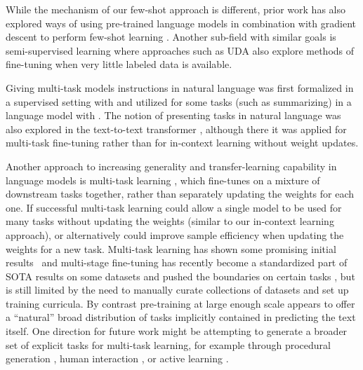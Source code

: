 While the mechanism of our few-shot approach is different, prior work has also explored ways of using pre-trained language models in combination with gradient descent to perform few-shot learning \cite{schick2020exploiting}. Another sub-field with similar goals is semi-supervised learning where approaches such as UDA \cite{xie2019unsupervised} also explore methods of fine-tuning when very little labeled data is available.

Giving multi-task models instructions in natural language was first formalized in a supervised setting with \cite{mccann2018natural} and utilized for some tasks (such as summarizing) in a language model with \cite{radford2019language}.  The notion of presenting tasks in natural language was also explored in the text-to-text transformer  \cite{raffel2019t5}, although there it was applied for multi-task fine-tuning rather than for in-context learning without weight updates.

Another approach to increasing generality and transfer-learning capability in language models is multi-task learning \cite{caruana1997multitask}, which fine-tunes on a mixture of downstream tasks together, rather than separately updating the weights for each one.  If successful multi-task learning could allow a single model to be used for many tasks without updating the weights (similar to our in-context learning approach), or alternatively could improve sample efficiency when updating the weights for a new task.  Multi-task learning has shown some promising initial results~\citep{liu2015representation, liu2018generating} and multi-stage fine-tuning has recently become a standardized part of SOTA results on some datasets \cite{phang2018sentence} and pushed the boundaries on certain tasks \cite{khashabi2020unifiedqa}, but is still limited by the need to manually curate collections of datasets and set up training curricula.  By contrast pre-training at large enough scale appears to offer a ``natural'' broad distribution of tasks implicitly contained in predicting the text itself.  One direction for future work might be attempting to generate a broader set of explicit tasks for multi-task learning, for example through procedural generation \cite{tobin2017domain}, human interaction \cite{Ziegler2019FineTuningLM}, or active learning \cite{mackay1992active}.

